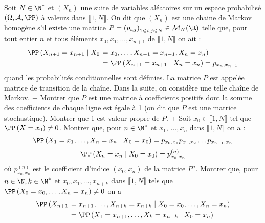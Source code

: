 \begin{exercise}[title=Chaînes de Markov] Soit $N \in \N^{*}$ et $\left(X_{n}\right)$ une suite de variables aléatoires sur un espace probabilisé $(\Omega, \mathcal{A}, \PP)$ à valeurs dans $\llbracket 1, N \rrbracket $. On dit que $\left(X_{n}\right)$ est une chaine de Markov homogène s'il existe une matrice $P=\left(p_{i, j}\right)_{1 \leqslant i, j \leqslant N} \in \mathcal{M}_{N}(\R)$ telle que, pour tout entier $n$ et tous éléments $x_{0}, x_{1}, \ldots, x_{n+1}$ de $\llbracket 1, N \rrbracket$ on ait :
\begin{equation*}
\begin{aligned}
\PP\left(X_{n+1}=x_{n+1} \mid X_{0}\right.&\left.=x_{0}, \ldots, X_{n-1}=x_{n-1}, X_{n}=x_{n}\right) \\
&=\PP\left(X_{n+1}=x_{n+1} \mid X_{n}=x_{n}\right)=p_{x_{n}, x_{n+1}}
\end{aligned}
\end{equation*}
quand les probabilités conditionnelles sont définies. La matrice $P$ est appelée matrice de transition de la chaîne. Dans la suite, on considère une telle chaîne de Markov.
\question+ Montrer que $P$ est une matrice à coefficients positifs dont la somme des coefficients de chaque ligne est égale à 1 (on dit que $P$ est une matrice stochastique). Montrer que 1 est valeur propre de $P$.
\question\question+ Soit $x_{0} \in \llbracket 1, N \rrbracket$ tel que $\PP\left(X=x_{0}\right) \neq 0$. Montrer que, pour $n \in \N^{*}$ et $x_{1}$, $\ldots, x_{n}$ dans $\llbracket 1, N \rrbracket$ on a :
\begin{equation*}
\PP\left(X_{1}=x_{1}, \ldots, X_{n}=x_{n} \mid X_{0}=x_{0}\right)=p_{x_{0}, x_{1}} p_{x_{1}, x_{2}} \ldots p_{x_{n-1}, x_{n}}
\end{equation*}
\begin{equation*}[En déduire que :]
\PP\left(X_{n}=x_{n} \mid X_{0}=x_{0}\right)=p_{x_{0}, x_{n}}^{(n)}
\end{equation*}
où $p_{x_{0}, x_{n}}^{(n)}$ est le coefficient d'indice $\left(x_{0}, x_{n}\right)$ de la matrice $P^{n}$.
\question Montrer que, pour $n \in \N, k \in \N^{*}$ et $x_{0}, x_{1}, \ldots, x_{n+k}$ dans $\llbracket 1, N \rrbracket$ tels que $\PP\left(X_{0}=x_{0}, \ldots, X_{n}=x_{n}\right) \neq 0$ on a
\begin{equation*}
\begin{aligned}
\PP\left(X_{n+1}\right.&\left.=x_{n+1}, \ldots, X_{n+k}=x_{n+k} \mid X_{0}=x_{0}, \ldots, X_{n}=x_{n}\right) \\
&=\PP\left(X_{1}=x_{n+1}, \ldots, X_{k}=x_{n+k} \mid X_{0}=x_{n}\right)

\end{aligned}
\end{equation*}
\end{exercise}
